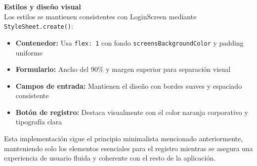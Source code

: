 \documentclass[twoside, openright, 11pt]{report}
\begin{document}
					\textbf{Estilos y diseño visual}\\
					Los estilos se mantienen consistentes con LoginScreen mediante \texttt{StyleSheet.create()}:
					
					\begin{itemize}
						\item \textbf{Contenedor:} Usa \texttt{flex: 1} con fondo \texttt{screensBackgroundColor} y padding uniforme
						\item \textbf{Formulario:} Ancho del 90\% y margen superior para separación visual
						\item \textbf{Campos de entrada:} Mantienen el diseño con bordes suaves y espaciado consistente
						\item \textbf{Botón de registro:} Destaca visualmente con el color naranja corporativo y tipografía clara
					\end{itemize}
					
					Esta implementación sigue el principio minimalista mencionado anteriormente, manteniendo solo los elementos esenciales para el registro mientras se asegura una experiencia de usuario fluida y coherente con el resto de la aplicación.
					
\end{document}
